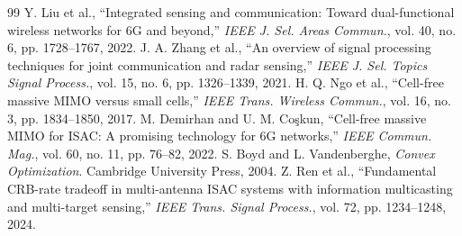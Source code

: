 \documentclass[12pt,a4paper]{article}
\begin{document}
\begin{thebibliography}{99}
 Y. Liu et al., ``Integrated sensing and communication: Toward dual-functional wireless networks for 6G and beyond,'' \textit{IEEE J. Sel. Areas Commun.}, vol. 40, no. 6, pp. 1728--1767, 2022.
 J. A. Zhang et al., ``An overview of signal processing techniques for joint communication and radar sensing,'' \textit{IEEE J. Sel. Topics Signal Process.}, vol. 15, no. 6, pp. 1326--1339, 2021.
 H. Q. Ngo et al., ``Cell-free massive MIMO versus small cells,'' \textit{IEEE Trans. Wireless Commun.}, vol. 16, no. 3, pp. 1834--1850, 2017.
 M. Demirhan and U. M. Coşkun, ``Cell-free massive MIMO for ISAC: A promising technology for 6G networks,'' \textit{IEEE Commun. Mag.}, vol. 60, no. 11, pp. 76--82, 2022.
 S. Boyd and L. Vandenberghe, \textit{Convex Optimization}. Cambridge University Press, 2004.
 Z. Ren et al., ``Fundamental CRB-rate tradeoff in multi-antenna ISAC systems with information multicasting and multi-target sensing,'' \textit{IEEE Trans. Signal Process.}, vol. 72, pp. 1234--1248, 2024.
\end{thebibliography}
\end{document}
